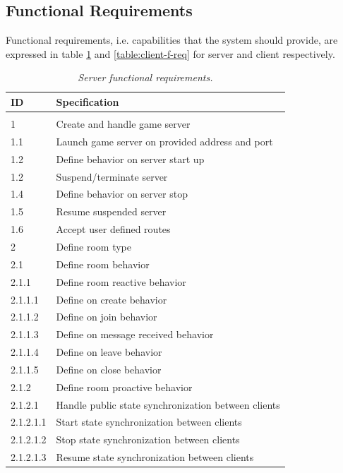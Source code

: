 \subsection{Functional Requirements}

Functional requirements, i.e. capabilities that the system should provide, are expressed in table \ref{table:server-f-req} and \ref{table:client-f-req} for server and client respectively.

\begin{center}
  \begin{longtable}{|l|l|} 
    \caption{\textit{Server functional requirements.}} \label{table:server-f-req} \\
  
\hline
ID   &  Specification \\
\hline
\multicolumn{2}{|c|}{} \\
\hline
1         & Create and handle game server \\
1.1       & Launch game server on provided address and port \\
1.2       & Define behavior on server start up \\
1.2       & Suspend/terminate server \\
1.4       & Define behavior on server stop \\
1.5       & Resume suspended server \\
1.6       & Accept user defined routes \\
2         & Define room type \\
2.1       & Define room behavior \\
2.1.1     & Define room reactive behavior \\
2.1.1.1   & Define on create behavior \\
2.1.1.2   & Define on join behavior \\
2.1.1.3   & Define on message received behavior \\
2.1.1.4   & Define on leave behavior \\
2.1.1.5   & Define on close behavior \\
2.1.2     & Define room proactive behavior \\
2.1.2.1   & Handle public state synchronization between clients \\
2.1.2.1.1 & Start state synchronization between clients \\
2.1.2.1.2 & Stop state synchronization between clients \\
2.1.2.1.3 & Resume state synchronization between clients \\

\end{longtable}
\end{center}
